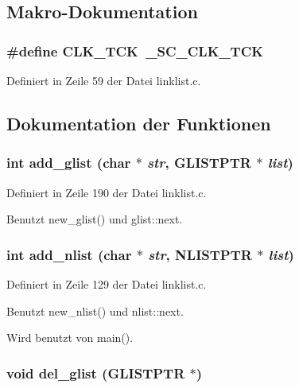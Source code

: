 \subsection{Makro-Dokumentation}
\subsubsection{\setlength{\rightskip}{0pt plus 5cm}\#define CLK\_\-TCK~\_\-SC\_\-CLK\_\-TCK}\label{linklist_8c_03df76d1f70664d745ca8de2864e39b3}




Definiert in Zeile 59 der Datei linklist.c.

\subsection{Dokumentation der Funktionen}
\subsubsection{\setlength{\rightskip}{0pt plus 5cm}int add\_\-glist (char $\ast$ {\em str}, {\bf GLISTPTR} $\ast$ {\em list})}\label{linklist_8c_7a76399c20af4803b0efcc757733039d}




Definiert in Zeile 190 der Datei linklist.c.

Benutzt new\_\-glist() und glist::next.
\subsubsection{\setlength{\rightskip}{0pt plus 5cm}int add\_\-nlist (char $\ast$ {\em str}, {\bf NLISTPTR} $\ast$ {\em list})}\label{linklist_8c_8839d62523e9b12655cca004617bbe77}




Definiert in Zeile 129 der Datei linklist.c.

Benutzt new\_\-nlist() und nlist::next.

Wird benutzt von main().
\subsubsection{\setlength{\rightskip}{0pt plus 5cm}void del\_\-glist ({\bf GLISTPTR} $\ast$)}\label{linklist_8c_2db320536d6c5a8726da8e8e627af50c}




